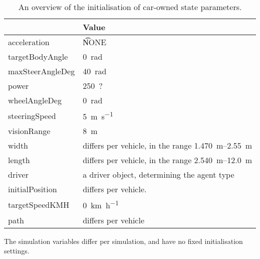\begin{table}
	\centering
	\begin{tabularx}{\textwidth}{>{\ttfamily}lX}
		\toprule
		\normalfont{Parameter}	& Value \\  
		\midrule
		acceleration 			
			& \t{NONE} \\ 
		targetBodyAngle 		
			& \SI[mode=text]{0}{\radian} \\ 
		maxSteerAngleDeg 		
			& \SI[mode=text]{40}{\radian} \\ 
		power 					
			& \SI[mode=text]{250}{?}\\ 
		wheelAngleDeg 			
			& \SI[mode=text]{0}{\radian} \\ 
		steeringSpeed 			
			& \SI[mode=text]{5}{\meter\per\second} \\ 
		visionRange 			
			& \SI[mode=text]{8}{\meter} \\ 
		width 					
			& differs per vehicle, in the range \SIrange{1.470}{2.55}{\meter} \\ 
		length 					
			& differs per vehicle, in the range \SIrange{2.540}{12.0}{\meter} \\ 
		driver 					
			& a driver object, determining the agent type \\
		initialPosition 		
			& differs per vehicle. \\ 
		targetSpeedKMH			
			& \SI[mode=text]{0}{\kilo\meter\per\hour} \\ 
		path					
			& differs per vehicle \\ 
		\bottomrule
	\end{tabularx}
	\caption{An overview of the initialisation of car-owned state parameters.}
	\label{tab:par:method:model:details:init:car:value}
\end{table} 


The simulation variables differ per simulation, and have no fixed initialisation settings.


